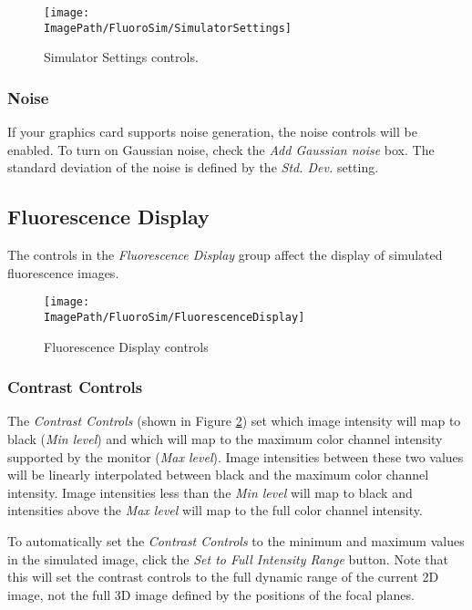 \documentclass[11pt,titlepage,twoside]{article}
\begin{document}
\begin{figure}[htbp] %
   \centering
   \texttt{[image: \\ImagePath/FluoroSim/SimulatorSettings]} 
   \caption{Simulator Settings controls.}
   \label{fig:FluoroSimSimulatorSettingsControls}
\end{figure}

\subsubsection{Noise} 

If your graphics card supports noise generation, the noise controls will be enabled. To turn on Gaussian noise, check the \emph{Add Gaussian noise} box. The standard deviation of the noise is defined by the \emph{Std. Dev.} setting.

\subsection{Fluorescence Display}

The controls in the \emph{Fluorescence Display} group affect the display of simulated fluorescence images.

\begin{figure}[htbp] %
   \centering
   \texttt{[image: \\ImagePath/FluoroSim/FluorescenceDisplay]} 
   \caption{Fluorescence Display controls}
   \label{fig:FluoroSimFluorescenceDisplayControls}
\end{figure}

\subsubsection{Contrast Controls}

The \emph{Contrast Controls} (shown in Figure \ref{fig:FluoroSimFluorescenceDisplayControls}) set which image intensity will map to black (\emph{Min level}) and which will map to the maximum color channel intensity supported by the monitor (\emph{Max level}). Image intensities between these two values will be linearly interpolated between black and the maximum color channel intensity. Image intensities less than the \emph{Min level} will map to black and intensities above the \emph{Max level} will map to the full color channel intensity.

To automatically set the \emph{Contrast Controls} to the minimum and maximum values in the simulated image, click the \emph{Set to Full Intensity Range} button. Note that this will set the contrast controls to the full dynamic range of the current 2D image, not the full 3D image defined by the positions of the focal planes.
\end{document}
